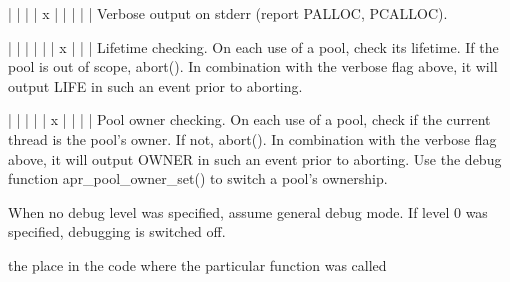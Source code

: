 \begin{DoxyPre}|   |   |   | x |   |   |   |   |  Verbose output on stderr (report
                                   PALLOC, PCALLOC).\end{DoxyPre}



\begin{DoxyPre}|   |   |   |   |   | x |   |   |  Lifetime checking. On each use of a
                                   pool, check its lifetime.  If the pool
                                   is out of scope, abort().
                                   In combination with the verbose flag
                                   above, it will output LIFE in such an
                                   event prior to aborting.\end{DoxyPre}



\begin{DoxyPre}|   |   |   |   | x |   |   |   |  Pool owner checking.  On each use of a
                                   pool, check if the current thread is the
                                   pool's owner.  If not, abort().  In
                                   combination with the verbose flag above,
                                   it will output OWNER in such an event
                                   prior to aborting.  Use the debug
                                   function apr\_pool\_owner\_set() to switch
                                   a pool's ownership.\end{DoxyPre}



\begin{DoxyPre}When no debug level was specified, assume general debug mode.
If level 0 was specified, debugging is switched off.
\end{DoxyPre}
the place in the code where the particular function was called 
